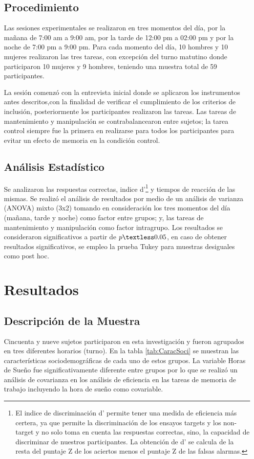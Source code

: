 \documentclass[12pt,letterpaper,final]{article}
\begin{document}
{
\subsection{Procedimiento}
Las sesiones experimentales se realizaron en tres momentos del día, por la mañana de 7:00 am a 9:00 am, por la tarde de 12:00 pm a 02:00 pm y por la noche de 7:00 pm a 9:00 pm. Para cada momento del día, 10 hombres y 10 mujeres realizaron  las tres tareas, con excepción del turno matutino donde participaron 10 mujeres y 9 hombres, teniendo una muestra total de 59 participantes.

La sesión comenzó con la entrevista inicial donde se aplicaron los instrumentos antes descritos,con la finalidad de verificar el cumplimiento de los criterios de inclusión, posteriormente los participantes realizaron las tareas. Las tareas de mantenimiento y manipulación se contrabalancearon entre sujetos; la tarea control siempre fue la primera en realizarse para todos los participantes para evitar un efecto de memoria en la condición control.
}
{
\subsection{Análisis Estadístico}
Se analizaron las respuestas correctas, indice d'\footnote{El indice de discriminación d’ permite tener una medida de eficiencia más certera, ya que permite la discriminación de los ensayos targets y los non-target  y no solo toma en cuenta las respuestas correctas, sino, la capacidad de discriminar de nuestros participantes.  La obtención de d’ se calcula de la resta del puntaje Z de los aciertos menos el puntaje Z de las falsas alarmas.} y tiempos de reacción de las mismas. Se realizó el análisis de resultados  por medio de un análisis de varianza (ANOVA) mixto (3x2) tomando en consideración los tres momentos del día (mañana, tarde y noche) como factor entre grupos; y, las tareas de mantenimiento y manipulación como factor intragrupo.
Los resultados se consideraron significativos a partir de $ p\textless0.05$, en caso de obtener resultados significativos, se empleo la prueba Tukey para muestras desiguales como post hoc.
}
\newpage

\section{Resultados}
\subsection{Descripción de la Muestra}
Cincuenta y nueve sujetos participaron en esta investigación y fueron  agrupados en tres diferentes horarios (turno). En la tabla \ref{tab:CaracSoci} se muestran las características sociodemográficas de cada uno de estos grupos. La variable Horas de Sueño fue significativamente diferente entre grupos por lo que se realizó un análisis de covarianza en los análisis de eficiencia en las tareas de memoria de trabajo incluyendo la hora de sueño como covariable. 
\end{document}
